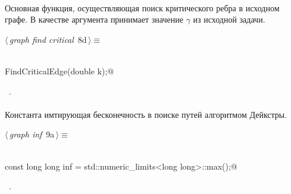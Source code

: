 \documentclass[12pt]{article}
\begin{document}
\paragraph{}
Основная функция, осуществляющая поиск критического ребра в исходном графе. В качестве аргумента принимает значение $\gamma$
из исходной задачи.
\begin{flushleft} \small
\begin{minipage}{\linewidth}\label{scrap12}\raggedright\small
{} $\langle\,${\itshape graph find critical}\nobreak\ {\footnotesize {8d}}$\,\rangle\equiv$
\vspace{-1ex}
\begin{list}{}{} \item
\mbox{}\verb@@\\
\mbox{}\verb@void FindCriticalEdge(double k);@\\
\mbox{}\verb@@{\NWsep}
\end{list}
\vspace{-1.5ex}
\footnotesize
\begin{list}{}{\setlength{\itemsep}{-\parsep}\setlength{\itemindent}{-\leftmargin}}
\item \NWtxtMacroRefIn\ .

\item{}
\end{list}
\end{minipage}\vspace{4ex}
\end{flushleft}
\paragraph{}
Константа имтирующая бесконечность в поиске путей алгоритмом Дейкстры.
\begin{flushleft} \small
\begin{minipage}{\linewidth}\label{scrap13}\raggedright\small
{} $\langle\,${\itshape graph inf}\nobreak\ {\footnotesize {9a}}$\,\rangle\equiv$
\vspace{-1ex}
\begin{list}{}{} \item
\mbox{}\verb@@\\
\mbox{}\verb@static const long long inf = std::numeric_limits<long long>::max();@\\
\mbox{}\verb@@{\NWsep}
\end{list}
\vspace{-1.5ex}
\footnotesize
\begin{list}{}{\setlength{\itemsep}{-\parsep}\setlength{\itemindent}{-\leftmargin}}
\item \NWtxtMacroRefIn\ .

\item{}
\end{list}
\end{minipage}\vspace{4ex}
\end{flushleft}
\end{document}
